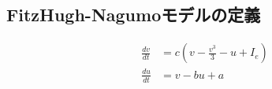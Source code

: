 \subsection{FitzHugh-Nagumoモデルの定義}


\begin{align*} \frac{dv}{dt} &= c\left(v-\frac{v^3}{3}-u+I_e\right)\\ 
\frac{du}{dt} &= v-bu+a \end{align*}
